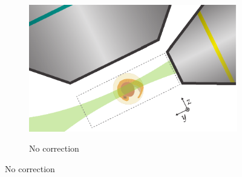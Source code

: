 \begin{figure}
	\centering
    \begin{subfigure}[t]{\textwidth}
        \centering
        \includegraphics{geometry/Schematic_thesis}
        \caption{}\label{fig:geometry/Schematic_thesis}
    \end{subfigure}\hfill
    \begin{subfigure}[t]{0.2\textwidth}
        \centering
        \caption{No correction}\label{fig:geometry/no_correction}
    \end{subfigure}\hfill

\end{figure}
